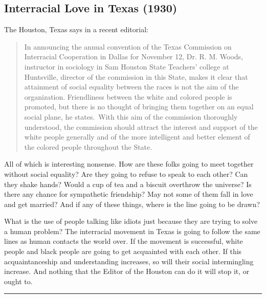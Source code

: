 \documentclass[letterpaper,10pt,english]{jupyterBook}
\begin{document}
\subsection{Interracial Love in Texas (1930)}
\label{\detokenize{Volumes/37/02/interracial_love_in_texas:interracial-love-in-texas-1930}}\label{\detokenize{Volumes/37/02/interracial_love_in_texas::doc}}
\sphinxAtStartPar
The Houston, Texas  says in a recent editorial:
\begin{quote}

\sphinxAtStartPar
In announcing the annual convention of the Texas Commission on Inter\sphinxhyphen{}racial Co\sphinxhyphen{}operation in Dallas for November 1\sphinxhyphen{}2, Dr. R. M. Woods, instructor in sociology in Sam Houston State Teachers’ college at Huntsville, director of the commission in this State, makes it clear that attainment of social equality between the races is not the aim of the organization. Friendliness between the white and colored people is promoted, but there is no thought of bringing them together on an equal social plane, he states. With this aim of the commission thoroughly understood, the commission should attract the interest and support of the white people generally and of the more intelligent and better element of the colored people throughout the State.
\end{quote}

\sphinxAtStartPar
All of which is interesting nonsense. How are these folks going to meet together without social equality? Are they going to refuse to speak to each other? Can they shake hands? Would a cup of tea and a biscuit overthrow the universe? Is there any chance for sympathetic friendship? May not some of them fall in love and get married? And if any of these things, where is the line going to be drawn?

\sphinxAtStartPar
What is the use of people talking like idiots just because they are trying to solve a human problem? The inter\sphinxhyphen{}racial movement in Texas is going to follow the same lines as human contacts the world over. If the movement is successful, white people and black people are going to get acquainted with each other. If this acquaintanceship and understanding increases, so will their social intermingling increase. And nothing that the Editor of the Houston  can do it will stop it, or ought to.


\bigskip\hrule\bigskip
\end{document}

